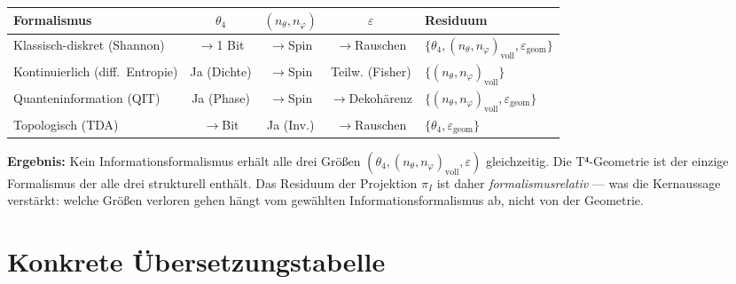 \begin{center}
\renewcommand{\arraystretch}{1.3}
{\footnotesize
\begin{tabular}{p{3.2cm}cccp{3.5cm}}
\toprule
\textbf{Formalismus} & $\theta_4$ & $(n_\theta,n_\varphi)$ & $\varepsilon$ & \textbf{Residuum} \\
\midrule
Klassisch-diskret (Shannon)
  & $\to$1 Bit & $\to$Spin & $\to$Rauschen
  & $\{\theta_4, (n_\theta,n_\varphi)_\text{voll}, \varepsilon_\text{geom}\}$ \\[3pt]
Kontinuierlich (diff.\ Entropie)
  & Ja (Dichte) & $\to$Spin & Teilw. (Fisher)
  & $\{(n_\theta,n_\varphi)_\text{voll}\}$ \\[3pt]
Quanteninformation (QIT)
  & Ja (Phase) & $\to$Spin & $\to$Deko\-härenz
  & $\{(n_\theta,n_\varphi)_\text{voll}, \varepsilon_\text{geom}\}$ \\[3pt]
Topologisch (TDA)
  & $\to$Bit & Ja (Inv.) & $\to$Rauschen
  & $\{\theta_4, \varepsilon_\text{geom}\}$ \\
\bottomrule
\end{tabular}
}
\end{center}

\textbf{Ergebnis:} Kein Informationsformalismus erhält alle drei Größen
$(\theta_4, (n_\theta,n_\varphi)_\text{voll}, \varepsilon)$ gleichzeitig.
Die T⁴-Geometrie ist der einzige Formalismus der alle drei strukturell
enthält. Das Residuum der Projektion $\pi_I$ ist daher \emph{formalismus\-relativ}
--- was die Kernaussage verstärkt: welche Größen verloren gehen hängt
vom gewählten Informationsformalismus ab, nicht von der Geometrie.

\section{Konkrete Übersetzungstabelle}

